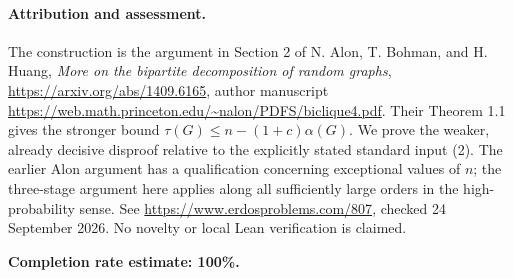 \paragraph{Attribution and assessment.}
The construction is the argument in Section 2 of N. Alon, T. Bohman, and H. Huang, \emph{More on the bipartite decomposition of random graphs}, \url{https://arxiv.org/abs/1409.6165}, author manuscript \url{https://web.math.princeton.edu/~nalon/PDFS/biclique4.pdf}. Their Theorem 1.1 gives the stronger bound \(\tau(G)\leq n-(1+c)\alpha(G)\). We prove the weaker, already decisive disproof relative to the explicitly stated standard input (2). The earlier Alon argument has a qualification concerning exceptional values of \(n\); the three-stage argument here applies along all sufficiently large orders in the high-probability sense. See \url{https://www.erdosproblems.com/807}, checked 24 September 2026. No novelty or local Lean verification is claimed.

\textbf{Completion rate estimate: 100\%.}
